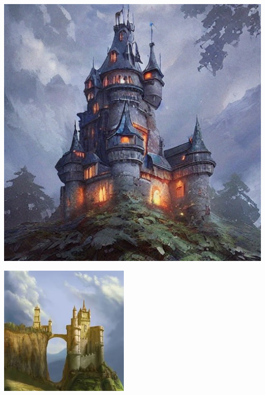 \documentclass[conference]{IEEEtran}
\begin{document}
\begin{center}
\begin{minipage}{0.24\textwidth}
\begin{minipage}{.5\textwidth}
        \label{fig:test2}
    \end{minipage}
  \end{minipage}
  \begin{minipage}{0.24\textwidth}
    \centering
      \begin{minipage}{.5\textwidth}
        \centering
        \includegraphics[width=0.9\linewidth]{castle1.jpg}
        \label{fig:test1}
      \end{minipage}%
      \begin{minipage}{.5\textwidth}
        \centering
        \includegraphics[width=0.9\linewidth]{castle2.jpg}

\end{minipage}
\end{minipage}
\end{center}
\end{document}
